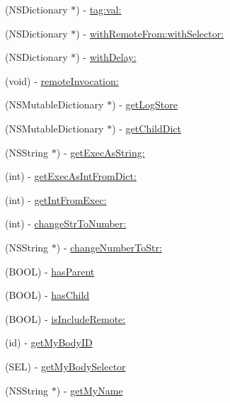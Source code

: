 \begin{DoxyCompactItemize}
(NSDictionary $\ast$) -\/ \hyperlink{interface_messenger_system_ad4e20b8da148b72f520986386c7fb8a5}{tag:val:}
\item 
(NSDictionary $\ast$) -\/ \hyperlink{interface_messenger_system_ad7b796c0354f4a6f380392421d4abc0d}{withRemoteFrom:withSelector:}
\item 
(NSDictionary $\ast$) -\/ \hyperlink{interface_messenger_system_ac424d46f571c01154893e4747a665930}{withDelay:}
\item 
(void) -\/ \hyperlink{interface_messenger_system_aaaa066451fb04c37c88e6a7efc94c63e}{remoteInvocation:}
\item 
(NSMutableDictionary $\ast$) -\/ \hyperlink{interface_messenger_system_a857e1c7932fdb366b52b687832c8e0bf}{getLogStore}
\item 
(NSMutableDictionary $\ast$) -\/ \hyperlink{interface_messenger_system_a057d907e4e7325c927580ace6701f95c}{getChildDict}
\item 
(NSString $\ast$) -\/ \hyperlink{interface_messenger_system_a1a0013cb76d7f354e7d71e09e0456766}{getExecAsString:}
\item 
(int) -\/ \hyperlink{interface_messenger_system_aef3cf1f4d71c77f66e6053dcd277beba}{getExecAsIntFromDict:}
\item 
(int) -\/ \hyperlink{interface_messenger_system_a881655597ee31052ca7cd72acd1343c2}{getIntFromExec:}
\item 
(int) -\/ \hyperlink{interface_messenger_system_a9c32da2a99a87a32c2567b29b4d411ac}{changeStrToNumber:}
\item 
(NSString $\ast$) -\/ \hyperlink{interface_messenger_system_ace36dcb764d249819d4ea85fac0afe5c}{changeNumberToStr:}
\item 
(BOOL) -\/ \hyperlink{interface_messenger_system_a4ab801cff2356929a18a551b3537f435}{hasParent}
\item 
(BOOL) -\/ \hyperlink{interface_messenger_system_a9db1bcbbaf0abb9e8e1af5a2aa5bf9fa}{hasChild}
\item 
(BOOL) -\/ \hyperlink{interface_messenger_system_a975357de1acaa17f15d90e67d0203ff4}{isIncludeRemote:}
\item 
(id) -\/ \hyperlink{interface_messenger_system_a7ebd928ddb4092333370af98d34095ed}{getMyBodyID}
\item 
(SEL) -\/ \hyperlink{interface_messenger_system_a0c021c0bc0628174e8b16f664205ebf6}{getMyBodySelector}
\item 
(NSString $\ast$) -\/ \hyperlink{interface_messenger_system_a8d6c34458dcb7c44337b68b2c47c9050}{getMyName}
\item 

\end{DoxyCompactItemize}

